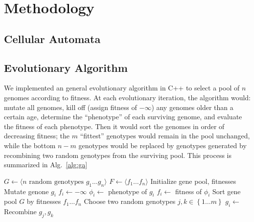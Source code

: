 \documentclass[twocolumn]{article}
\newcommand{\set}[1]{\left\{#1\right\}}
\newcommand{\seq}[1]{\langle #1 \rangle}
\newcommand{\alg}[1]{Alg.~#1}
\begin{document}
\section{Methodology}

\subsection{Cellular Automata}

\subsection{Evolutionary Algorithm}
We implemented an general evolutionary algorithm in C++ to select a pool of $n$ genomes according to fitness.  At each evolutionary iteration, the algorithm would: mutate all genomes, kill off (assign fitness of $-\infty$) any genomes older than a certain age, determine the ``phenotype'' of each surviving genome, and evaluate the fitness of each phenotype. Then it would sort the genomes in order of decreasing fitness; the $m$ ``fittest'' genotypes would remain in the pool unchanged, while the bottom $n-m$ genotypes would be replaced by genotypes generated by recombining two random genotypes from the surviving pool. This process is summarized in \alg{\ref{alg:ga}}

\begin{algorithm}
\label{alg:ga}
\begin{algorithmic}[1]
	\State $G \gets \seq{\text{$n$ random genotypes $g_1 \ldots g_n$}}$
	\State $F \gets \seq{f_1 \ldots f_n}$
	\Statex \Comment Initialize gene pool, fitnesses
	\Repeat
		\ForAll{$i \in \set{1 \ldots n}$}
			\State Mutate genone $g_i$
				\State $f_i \gets -\infty$
			\Else
				\State $\phi_i \gets$ phenotype of $g_i$
				\State $f_i \gets$ fitness of $\phi_i$
			\EndIf
		\EndFor
		\State Sort gene pool $G$ by fitnesses $f_1 \ldots f_n$
		\ForAll{$i \in \set{m \ldots n}$}
			\State Choose two random genotypes 
			\State $j,k \in \set{1 \ldots m}$
			\State $g_i \gets$ Recombine $g_j, g_k$
		\EndFor
	\EndProcedure
\end{algorithmic}
\end{algorithm}
\end{document}
